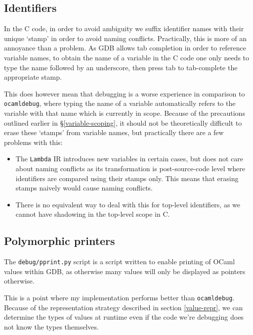 \subsection{Identifiers}

In the C code, in order to avoid ambiguity we suffix identifier names with 
their unique `stamp' in order to avoid naming conflicts. Practically, this is 
more of an annoyance than a problem. As GDB allows tab completion in order to 
reference variable names, to obtain the name of a variable in the C code one 
only needs to type the name followed by an underscore, then press tab to 
tab-complete the appropriate stamp.

This does however mean that debugging is a worse experience in comparison to
\texttt{ocamldebug}, where typing the name of a variable automatically refers to
the variable with that name which is currently in scope. Because of the
precautions outlined earlier in \S\ref{variable-scoping}, it should not be
theoretically difficult to erase these `stamps' from variable names, but
practically there are a few problems with this:

\begin{itemize}
    \item The \texttt{Lambda} IR introduces new variables in certain cases, but 
    does not care about naming conflicts as its transformation is 
    post-source-code level where identifiers are compared using their stamps 
    only. This means that erasing stamps naively would cause naming conflicts.
    \item There is no equivalent way to deal with this for top-level 
    identifiers, as we cannot have shadowing in the top-level scope in C.
\end{itemize}

\subsection{Polymorphic printers}

The \texttt{debug/pprint.py} script is a script written to enable printing of 
OCaml values within GDB, as otherwise many values will only be displayed as 
pointers otherwise.

This is a point where my implementation performs better than 
\texttt{ocamldebug}. Because of the representation strategy described in section
\ref{value-repr}, we can determine the types of values at runtime even if the 
code we're debugging does not know the types themselves.

